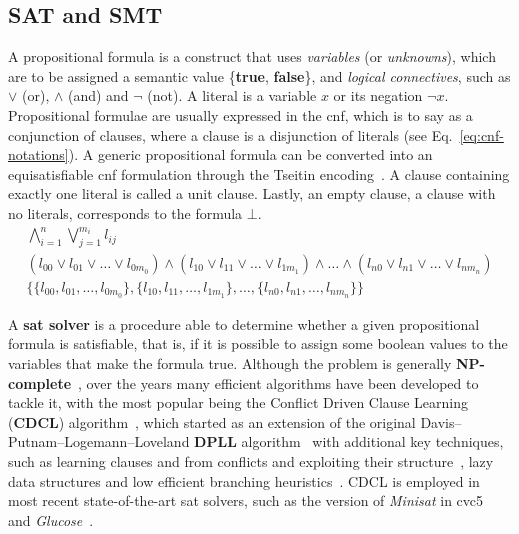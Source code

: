 \documentclass[runningheads]{llncs}
\begin{document}
\subsection{SAT and SMT}

A propositional formula is a construct that uses \textit{variables} (or \textit{unknowns}), which are to be assigned a semantic value \{\textbf{true}, \textbf{false}\}, and \textit{logical connectives}, such as $\lor$ (or), $\land$ (and) and $\neg$ (not).
A literal is a variable $x$ or its negation $\neg x$.
Propositional formulae are usually expressed in the \gls{cnf}, which is to say as a conjunction of clauses, where a clause is a disjunction of literals (see Eq.~\ref{eq:cnf-notations}).
A generic propositional formula can be converted into an equisatisfiable \gls{cnf} formulation through the Tseitin encoding~\cite{ref:handbook-sat}.
A clause containing exactly one literal is called a unit clause.
Lastly, an empty clause, a clause with no literals, corresponds to the formula $\bot$.
\begin{equation}
    \label{eq:cnf-notations}
    \begin{gathered}
        \bigwedge_{i=1}^n \bigvee_{j=1}^{m_i} l_{ij} \\
        ( l_{00} \lor l_{01} \lor \dots \lor l_{0m_0}) \land (l_{10} \lor l_{11} \lor \dots \lor l_{1m_1}) \land \dots \land (l_{n0} \lor l_{n1} \lor \dots \lor l_{nm_n}) \\
        \{ \{ l_{00}, l_{01} , \dots , l_{0m_0} \} , \{ l_{10} , l_{11} , \dots , l_{1m_1} \}, \dots , \{ l_{n0} , l_{n1} , \dots , l_{nm_n} \} \}
    \end{gathered}
\end{equation}

A \textbf{\gls{sat} solver} is a procedure able to determine whether a given propositional formula is satisfiable, that is, if it is possible to assign some boolean values to the variables that make the formula true.
Although the problem is generally \textbf{NP-complete}~\cite{ref:np-sat}, over the years many efficient algorithms have been developed to tackle it, with the most popular being the Conflict Driven Clause Learning (\textbf{CDCL}) algorithm~\cite{ref:handbook-sat}, which started as an extension of the original Davis–Putnam–Logemann–Loveland \textbf{DPLL} algorithm~\cite{ref:dpll} with additional key techniques, such as learning clauses and from conflicts and exploiting their structure~\cite{ref:conflict-driven-clause-learning}, lazy data structures and low efficient branching heuristics~\cite{ref:watched-literals}.
CDCL is employed in most recent state-of-the-art \gls{sat} solvers, such as the version of \textit{Minisat} in cvc5~\cite{ref:cvc5-smt-comp-2022} and \textit{Glucose}~\cite{ref:glucose}.
\end{document}

